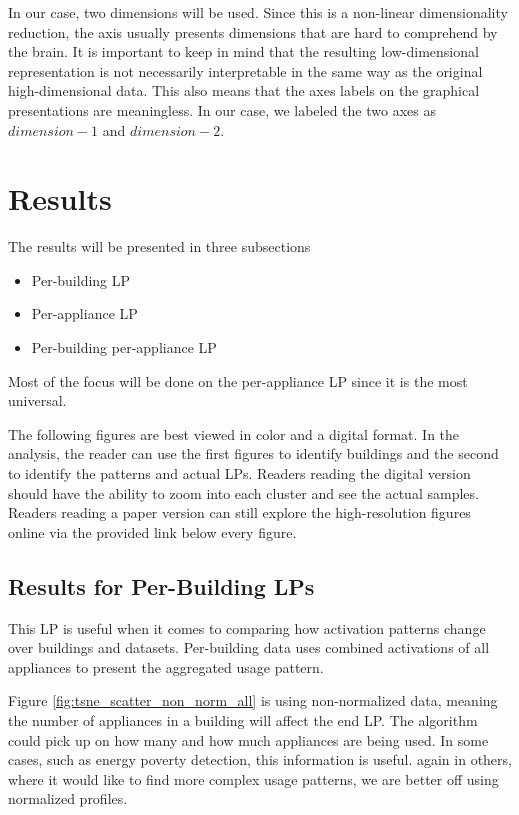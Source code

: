 In our case, two dimensions will be used. Since this is a non-linear dimensionality reduction,
the axis usually presents dimensions that are hard to comprehend by the brain. 
It is important to keep in mind that the resulting low-dimensional representation is not necessarily interpretable in the same way as the original high-dimensional data.
This also means that the axes labels on the graphical presentations are meaningless.
In our case, we labeled the two axes as $dimension-1$ and $dimension-2$.

\section{Results}

The results will be presented in three subsections

\begin{itemize}
	\item Per-building LP
	\item Per-appliance LP
	\item Per-building per-appliance LP
\end{itemize}

Most of the focus will be done on the per-appliance LP since it is the most universal.

The following figures are best viewed in color and a digital format. 
In the analysis, the reader can use the first figures to identify buildings and the second to identify the patterns and actual LPs.
Readers reading the digital version should have the ability to zoom into each cluster and see the actual samples. 
Readers reading a paper version can still explore the high-resolution figures online via the provided link below every figure.

\subsection{Results for Per-Building LPs}
\label{ssec:res_pb_lp}
This LP is useful when it comes to comparing how 
activation patterns change over buildings and datasets.
Per-building data uses combined activations of all appliances to present 
the aggregated usage pattern.  

Figure \ref{fig:tsne_scatter_non_norm_all} is using non-normalized data, meaning
the number of appliances in a building will affect the end LP.
The algorithm could pick up on how many and how much appliances are being used.
In some cases, such as energy poverty detection, this information is useful.
again in others, where it would like to find more complex usage patterns, we are better off using normalized profiles.

